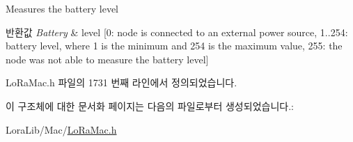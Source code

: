 Measures the battery level 


\begin{DoxyRetVals}{반환값}
{\em Battery} & level \mbox{[}0\+: node is connected to an external power source, 1..254\+: battery level, where 1 is the minimum and 254 is the maximum value, 255\+: the node was not able to measure the battery level\mbox{]} \\
\hline
\end{DoxyRetVals}


Lo\+Ra\+Mac.\+h 파일의 1731 번째 라인에서 정의되었습니다.



이 구조체에 대한 문서화 페이지는 다음의 파일로부터 생성되었습니다.\+:\begin{DoxyCompactItemize}
\item 
Lora\+Lib/\+Mac/\mbox{\hyperlink{_lo_ra_mac_8h}{Lo\+Ra\+Mac.\+h}}\end{DoxyCompactItemize}
